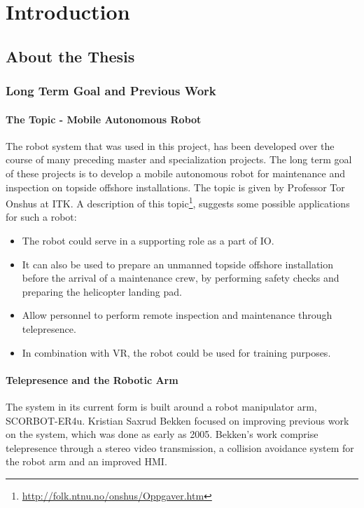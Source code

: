 \chapter{Introduction}
\label{chp:introduction} 

\section{About the Thesis}

\subsection{Long Term Goal and Previous Work}

\subsubsection{The Topic - Mobile Autonomous Robot}

The robot system that was used in this project, has been developed over the course of many preceding master and specialization projects. The long term goal of these projects is to develop a mobile autonomous robot for maintenance and inspection on topside offshore installations. The topic is given by Professor Tor Onshus at \ac{ITK}. A description of this topic\footnote{\url{http://folk.ntnu.no/onshus/Oppgaver.htm}}, suggests some possible applications for such a robot: 

\begin{itemize}
	\item The robot could serve in a supporting role as a part of \ac{IO}.
	\item It can also be used to prepare an unmanned topside offshore installation before the arrival of a maintenance crew, by performing safety checks and preparing the helicopter landing pad.  
	\item Allow personnel to perform remote inspection and maintenance through telepresence.
	\item  In combination with \ac{VR}, the robot could be used for training purposes. 
\end{itemize}

\subsubsection{Telepresence and the Robotic Arm}

The system in its current form is built around a robot manipulator arm, SCORBOT-ER4u. Kristian Saxrud Bekken focused on improving previous work on the system, which was done as early as 2005\cite{bekken}. Bekken's work comprise telepresence through a stereo video transmission, a collision avoidance system for the robot arm and an improved \ac{HMI}.

